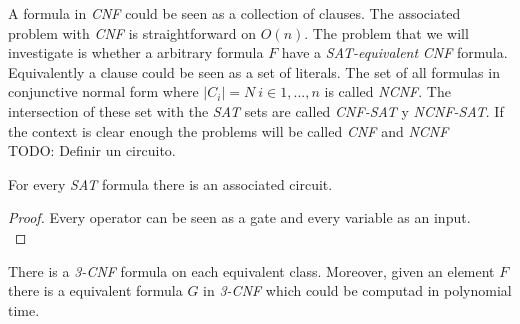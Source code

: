     
      A formula in \emph{CNF} could be seen as a collection of clauses. The associated problem with \emph{CNF} is straightforward on $O(n)$. The problem that we will investigate is whether a arbitrary formula $F$ have a \emph{SAT-equivalent} \emph{CNF} formula.\\
      
    Equivalently a clause could be seen as a set of literals. The set of all formulas in conjunctive normal form where $|C_i| = N\ i \in 1,...,n$ is called \emph{NCNF}. The intersection of these set with the \emph{SAT} sets are called \emph{CNF-SAT} y \emph{NCNF-SAT}. If the context is clear enough the problems will be called \emph{CNF} and \emph{NCNF}\\


    TODO: Definir un circuito.
    
    \begin{lemma}
      For every \emph{SAT} formula there is an associated circuit.
    \end{lemma}
    \begin{proof}
      Every operator can be seen as a gate and every variable as an input.\\
    \end{proof}
    
    \begin{theorem} \label{the:Tseitin}
      There is a \emph{3-CNF} formula on each equivalent class. Moreover, given an element $F$  there is a equivalent formula $G$  in \emph{3-CNF} which could be computad in polynomial time. 
    \end{theorem}

